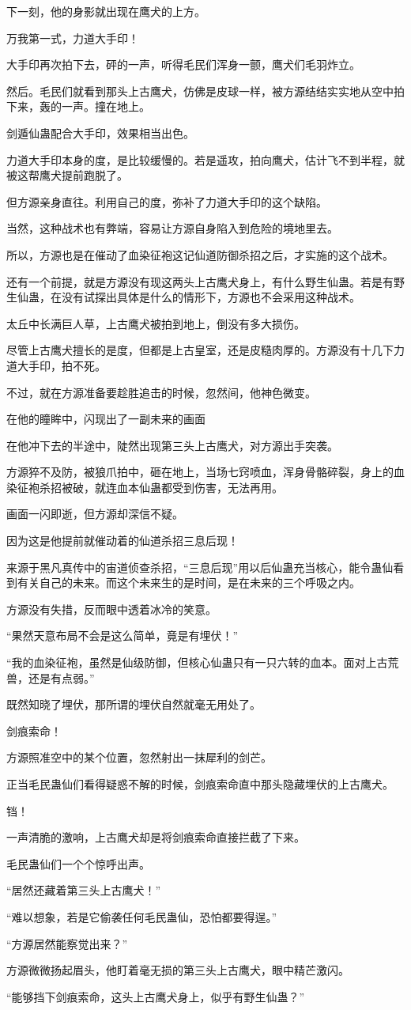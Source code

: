 \begin{this_body}
下一刻，他的身影就出现在鹰犬的上方。

万我第一式，力道大手印！

大手印再次拍下去，砰的一声，听得毛民们浑身一颤，鹰犬们毛羽炸立。

然后。毛民们就看到那头上古鹰犬，仿佛是皮球一样，被方源结结实实地从空中拍下来，轰的一声。撞在地上。

剑遁仙蛊配合大手印，效果相当出色。

力道大手印本身的度，是比较缓慢的。若是遥攻，拍向鹰犬，估计飞不到半程，就被这帮鹰犬提前跑脱了。

但方源亲身直往。利用自己的度，弥补了力道大手印的这个缺陷。

当然，这种战术也有弊端，容易让方源自身陷入到危险的境地里去。

所以，方源也是在催动了血染征袍这记仙道防御杀招之后，才实施的这个战术。

还有一个前提，就是方源没有现这两头上古鹰犬身上，有什么野生仙蛊。若是有野生仙蛊，在没有试探出具体是什么的情形下，方源也不会采用这种战术。

太丘中长满巨人草，上古鹰犬被拍到地上，倒没有多大损伤。

尽管上古鹰犬擅长的是度，但都是上古皇室，还是皮糙肉厚的。方源没有十几下力道大手印，拍不死。

不过，就在方源准备要趁胜追击的时候，忽然间，他神色微变。

在他的瞳眸中，闪现出了一副未来的画面

在他冲下去的半途中，陡然出现第三头上古鹰犬，对方源出手突袭。

方源猝不及防，被狼爪拍中，砸在地上，当场七窍喷血，浑身骨骼碎裂，身上的血染征袍杀招被破，就连血本仙蛊都受到伤害，无法再用。

画面一闪即逝，但方源却深信不疑。

因为这是他提前就催动着的仙道杀招三息后现！

来源于黑凡真传中的宙道侦查杀招，“三息后现”用以后仙蛊充当核心，能令蛊仙看到有关自己的未来。而这个未来生的是时间，是在未来的三个呼吸之内。

方源没有失措，反而眼中透着冰冷的笑意。

“果然天意布局不会是这么简单，竟是有埋伏！”

“我的血染征袍，虽然是仙级防御，但核心仙蛊只有一只六转的血本。面对上古荒兽，还是有点弱。”

既然知晓了埋伏，那所谓的埋伏自然就毫无用处了。

剑痕索命！

方源照准空中的某个位置，忽然射出一抹犀利的剑芒。

正当毛民蛊仙们看得疑惑不解的时候，剑痕索命直中那头隐藏埋伏的上古鹰犬。

铛！

一声清脆的激响，上古鹰犬却是将剑痕索命直接拦截了下来。

毛民蛊仙们一个个惊呼出声。

“居然还藏着第三头上古鹰犬！”

“难以想象，若是它偷袭任何毛民蛊仙，恐怕都要得逞。”

“方源居然能察觉出来？”

方源微微扬起眉头，他盯着毫无损的第三头上古鹰犬，眼中精芒激闪。

“能够挡下剑痕索命，这头上古鹰犬身上，似乎有野生仙蛊？”

\end{this_body}


